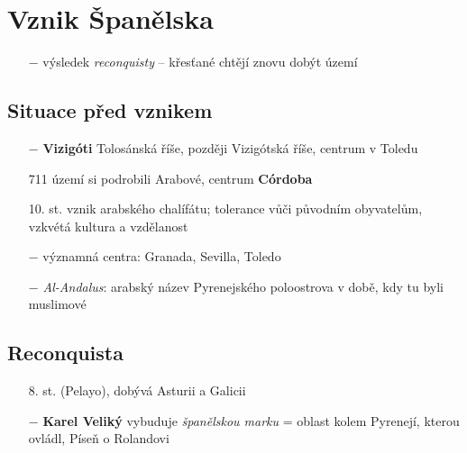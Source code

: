 \documentclass{article}
\begin{document}
\section*{Vznik Španělska}
\begin{itemize}
    \vspace{-0.5em}
    \setlength\itemsep{0.15em}
    \item[$-$] výsledek \textit{reconquisty} -- křesťané chtějí znovu dobýt území
\end{itemize}

\subsection*{Situace před vznikem}
\begin{itemize}
    \vspace{-0.5em}
    \setlength\itemsep{0.15em}
    \item[$-$] \textbf{Vizigóti} Tolosánská říše, později Vizigótská říše, centrum v Toledu
    \item[711] území si podrobili Arabové, centrum \textbf{Córdoba}
    \item[10. st.] vznik arabského chalífátu; tolerance vůči původním obyvatelům, vzkvétá kultura a vzdělanost
    \item[$-$] významná centra: Granada, Sevilla, Toledo
    \item[$-$] \textit{Al-Andalus}: arabský název Pyrenejského poloostrova v době, kdy tu byli muslimové
\end{itemize}

\subsection*{Reconquista}
\begin{itemize}
    \vspace{-0.5em}
    \setlength\itemsep{0.15em}
    \item[8. st.] (Pelayo), dobývá Asturii a Galicii
    \item[$-$] \textbf{Karel Veliký} vybuduje \textit{španělskou marku} = oblast kolem Pyrenejí, kterou ovládl, Píseň o Rolandovi
\end{itemize}
\end{document}
